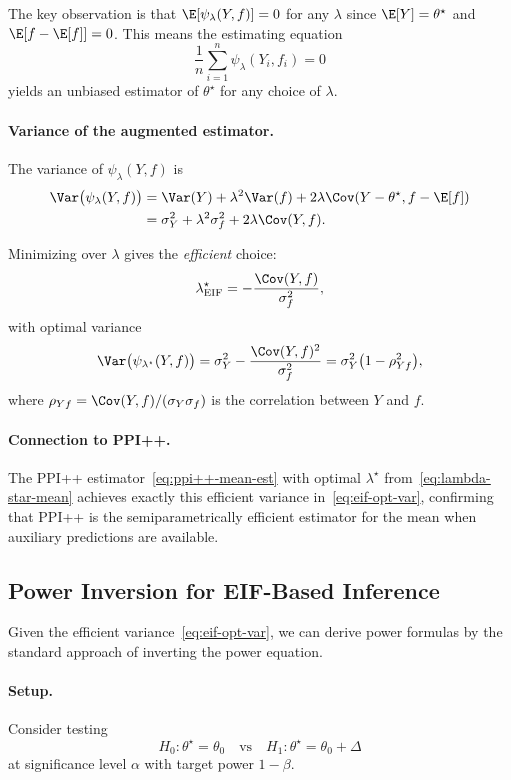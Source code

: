 The key observation is that $\E[\psi_\lambda(Y, f)] = 0$ for any $\lambda$ since
$\E[Y] = \theta^\star$ and $\E[f - \E[f]] = 0$. This means the estimating equation
\[
\frac{1}{n}\sum_{i=1}^n \psi_\lambda(Y_i, f_i) = 0
\]
yields an unbiased estimator of $\theta^\star$ for any choice of $\lambda$.

\paragraph{Variance of the augmented estimator.}
The variance of $\psi_\lambda(Y, f)$ is
\begin{align*}
\Var\big(\psi_\lambda(Y, f)\big)
&= \Var(Y) + \lambda^2 \Var(f) + 2\lambda\Cov(Y - \theta^\star, f - \E[f])\\
&= \sigma_Y^2 + \lambda^2 \sigma_f^2 + 2\lambda\Cov(Y, f).
\end{align*}

Minimizing over $\lambda$ gives the \emph{efficient} choice:
\begin{equation}\label{eq:eif-lambda-star}
\lambda^\star_{\text{EIF}} = -\frac{\Cov(Y, f)}{\sigma_f^2},
\end{equation}
with optimal variance
\begin{equation}\label{eq:eif-opt-var}
\Var\big(\psi_{\lambda^\star}(Y, f)\big)
= \sigma_Y^2 - \frac{\Cov(Y, f)^2}{\sigma_f^2}
= \sigma_Y^2 \big(1 - \rho^2_{Yf}\big),
\end{equation}
where $\rho_{Yf} = \Cov(Y, f)/(\sigma_Y \sigma_f)$ is the correlation between $Y$ and $f$.

\paragraph{Connection to PPI++.}
The PPI++ estimator~\eqref{eq:ppi++-mean-est} with optimal $\lambda^\star$ from~\eqref{eq:lambda-star-mean}
achieves exactly this efficient variance in~\eqref{eq:eif-opt-var}, confirming that
PPI++ is the semiparametrically efficient estimator for the mean when auxiliary predictions are available.

\subsection{Power Inversion for EIF-Based Inference}

Given the efficient variance~\eqref{eq:eif-opt-var}, we can derive power formulas by
the standard approach of inverting the power equation.

\paragraph{Setup.}
Consider testing
\[
H_0: \theta^\star = \theta_0 \quad \text{vs} \quad H_1: \theta^\star = \theta_0 + \Delta
\]
at significance level $\alpha$ with target power $1 - \beta$.

